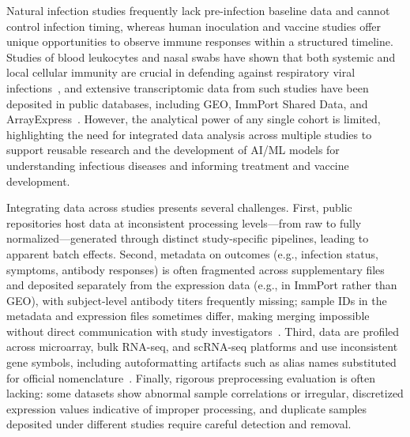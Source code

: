 \documentclass[
  12pt]{article}
\begin{document}
Natural infection studies frequently lack pre-infection baseline data and cannot control infection timing, whereas human inoculation and vaccine studies offer unique opportunities to observe immune responses within a structured timeline. Studies of blood leukocytes and nasal swabs have shown that both systemic and local cellular immunity are crucial in defending against respiratory viral infections~\citep{liu2016individualized,zaas2009gene,huang2011temporal,davenport2015transcriptomic,rosenheim2023sars,proud2008gene,muller2017development,habibi2020neutrophilic}, and extensive transcriptomic data from such studies have been deposited in public databases, including GEO, ImmPort Shared Data, and ArrayExpress~\citep{barrett2012ncbi,bhattacharya2018immport,parkinson2007arrayexpress}. However, the analytical power of any single cohort is limited, highlighting the need for integrated data analysis across multiple studies to support reusable research and the development of AI/ML models for understanding infectious diseases and informing treatment and vaccine development.

Integrating data across studies presents several challenges. First, public repositories host data at inconsistent processing levels---from raw to fully normalized---generated through distinct study-specific pipelines, leading to apparent batch effects. Second, metadata on outcomes (e.g., infection status, symptoms, antibody responses) is often fragmented across supplementary files and deposited separately from the expression data (e.g., in ImmPort rather than GEO), with subject-level antibody titers frequently missing; sample IDs in the metadata and expression files sometimes differ, making merging impossible without direct communication with study investigators~\citep{grewe2024mva,lee2022prior,furman2017expression}. Third, data are profiled across microarray, bulk RNA-seq, and scRNA-seq platforms and use inconsistent gene symbols, including autoformatting artifacts such as alias names substituted for official nomenclature~\citep{ziemann2016gene}. Finally, rigorous preprocessing evaluation is often lacking: some datasets show abnormal sample correlations or irregular, discretized expression values indicative of improper processing, and duplicate samples deposited under different studies require careful detection and removal.
\end{document}
